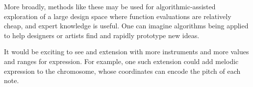 \documentclass[conference]{IEEEtran}
\begin{document}
More broadly, methods like these may be used for algorithmic-assisted
exploration of a large design space where function evaluations are relatively
cheap, and expert knowledge is useful. One can imagine algorithms being applied
to help designers or artists find and rapidly prototype new ideas.

It would be exciting to see and extension with more instruments and more values
and ranges for expression. For example, one such extension could add melodic
expression to the chromosome, whose coordinates can encode the pitch of each
note.







\end{document}
